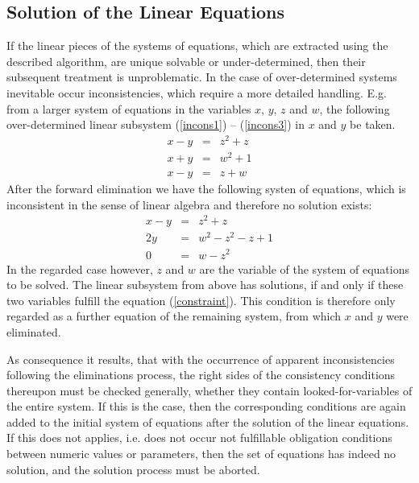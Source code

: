 \subsection{\label{LoesungLin}Solution of the Linear Equations}

If the linear pieces of the systems of equations, which are extracted using the described algorithm, are unique solvable or under-determined, then their subsequent treatment is unproblematic. In the case of over-determined systems inevitable  occur inconsistencies,  which require a more detailed handling. E.g. from a larger system of equations in the variables  $x$, $y$, $z$ and $w$,  the following over-determined  linear subsystem (\ref{incons1}) -- (\ref{incons3}) in $x$ and $y$ be taken.
\begin{eqnarray}
x - y &=& z^2 + z  \label{incons1} \\
x + y &=& w^2 +1   \label{incons2} \\
x - y &=& z + w    \label{incons3} 
\end{eqnarray}
After the forward elimination we have the following systen of equations, which is inconsistent in the sense of linear algebra and therefore no solution exists:
\begin{eqnarray}
x - y &=& z^2 + z           \\
   2y &=& w^2 - z^2 - z + 1 \\
    0 &=& w - z^2           \label{constraint}        
\end{eqnarray}
In the regarded case however,  $z$ and $w$ are the variable of the system of equations to be solved. The  linear subsystem from above has solutions, if and only if these two variables fulfill the equation (\ref{constraint}). This condition is therefore only regarded  as a further equation of the remaining system, from which $x$ and $y$ were eliminated.

As consequence it results, that with the occurrence of apparent inconsistencies following the eliminations process,   the right sides of the consistency conditions thereupon must be checked generally, whether they contain looked-for-variables of the entire system. If this is the case, then the corresponding conditions are again added to the initial system of equations after the solution of the linear equations. If this does not applies, i.e. does not occur not fulfillable obligation conditions between numeric values or parameters, then the set of equations has indeed no solution, and the solution process must be aborted.


